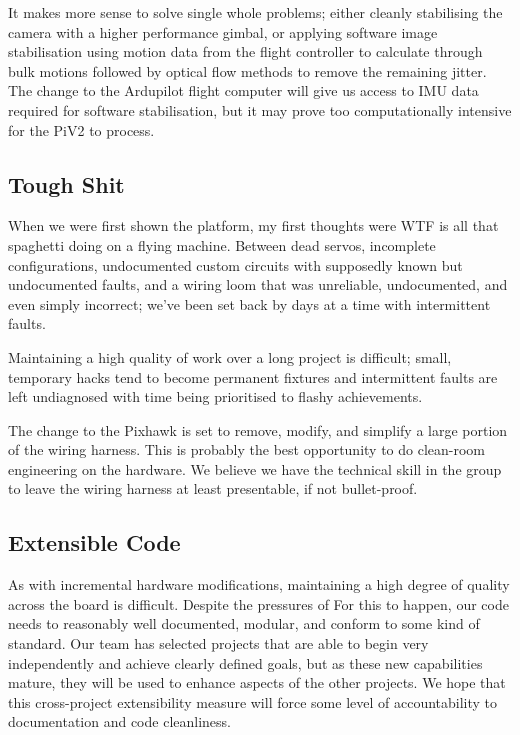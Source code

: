 \documentclass[11pt]{article}
\begin{document}
      It makes more sense to solve single whole problems; either cleanly stabilising the camera with a higher performance gimbal, or applying software image stabilisation using motion data from the flight controller to calculate through bulk motions followed by optical flow methods to remove the remaining jitter.
      The change to the Ardupilot flight computer will give us access to IMU data required for software stabilisation, but it may prove too computationally intensive for the PiV2 to process.


    \subsection{Tough Shit}
    \label{sec:Reliability}
      When we were first shown the platform, my first thoughts were WTF is all that spaghetti doing on a flying machine.
      Between dead servos, incomplete configurations, undocumented custom circuits with supposedly known but undocumented faults, and a wiring loom that was unreliable, undocumented, and even simply incorrect;  we've been set back by days at a time with intermittent faults.

      Maintaining a high quality of work over a long project is difficult; small, temporary hacks tend to become permanent fixtures and intermittent faults are left undiagnosed with time being prioritised to flashy achievements.

      The change to the Pixhawk is set to remove, modify, and simplify a large portion of the wiring harness.  This is probably the best opportunity to do clean-room engineering on the hardware.  We believe we have the technical skill in the group to leave the wiring harness at least presentable, if not bullet-proof.


    \subsection{Extensible Code}
      As with incremental hardware modifications, maintaining a high degree of quality across the board is difficult.  Despite the pressures of 
      For this to happen, our code needs to reasonably well documented, modular, and conform to some kind of standard. 
      Our team has selected projects that are able to begin very independently and achieve clearly defined goals, but as these new capabilities mature, they will be used to enhance aspects of the other projects.  We hope that this cross-project extensibility measure will force some level of accountability to documentation and code cleanliness.
\end{document}
